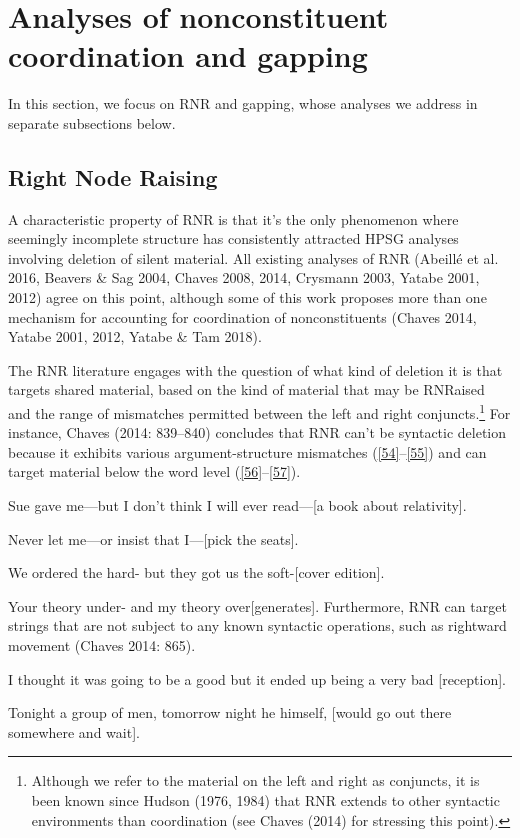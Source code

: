 \documentclass[output=paper]{langsci/langscibook}
\begin{document}
{\section{Analyses of nonconstituent coordination and gapping}
In this section, we focus on RNR and gapping, whose analyses we address in separate subsections below.

\subsection{Right Node Raising}
A characteristic property of RNR is that it's the only phenomenon where seemingly incomplete structure has consistently attracted HPSG analyses involving deletion of silent material. All existing analyses of RNR (Abeill\'{e} et al. 2016, Beavers \& Sag 2004, Chaves 2008, 2014, Crysmann 2003, Yatabe 2001, 2012) agree on this point, although some of this work proposes more than one mechanism for accounting for coordination of nonconstituents (Chaves 2014, Yatabe 2001, 2012, Yatabe \& Tam 2018).

The RNR literature engages with the question of what kind of deletion it is that targets shared material, based on the kind of material that may be RNRaised and the range of mismatches permitted between the left and right conjuncts.\footnote{Although we refer to the material on the left and right as conjuncts, it is been known since Hudson (1976, 1984) that RNR extends to other syntactic environments than coordination (see Chaves (2014) for stressing this point).} For instance, Chaves (2014: 839--840) concludes that RNR can't be syntactic deletion because it exhibits various argument-structure mismatches (\ref{54}--\ref{55}) and can target material below the word level (\ref{56}--\ref{57}).


\ea Sue gave me---but I don't think I will ever read---[a book about relativity]. \label{54}\z

\ea Never let me---or insist that I---[pick the seats].\label{55}\z

\ea We ordered the hard- but they got us the soft-[cover edition].\label{56}\z

\ea Your theory under- and my theory over[generates].\label{57}\z
Furthermore, RNR can target strings that are not subject to any known syntactic operations, such as rightward movement (Chaves 2014: 865).

\ea I thought it was going to be a good but it ended up being a very bad [reception].\label{58}\z

\ea Tonight a group of men, tomorrow night he himself, [would go out there somewhere and wait].\label{59}\z

}
\end{document}
